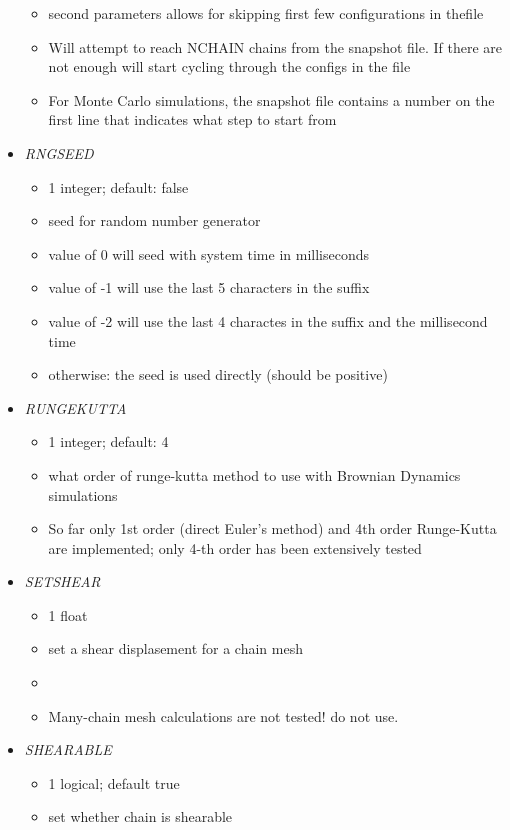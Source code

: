 \documentclass[12pt]{article}
\begin{document}
\begin{itemize}
\begin{itemize}
    \item second parameters allows for skipping first few configurations in thefile
    \item Will attempt to reach NCHAIN chains from the snapshot file. If there are not enough will start cycling through the configs in the file
    \item For Monte Carlo simulations, the snapshot file contains a number on the first line that indicates what step to start from
  \end{itemize}
%
\item {\it RNGSEED}
  \begin{itemize}
    \item 1 integer; default: false
    \item seed for random number generator
    \item value of 0 will seed with system time in milliseconds
    \item value of -1 will use the last 5 characters in the suffix
    \item value of -2 will use the last 4 charactes in the suffix and the millisecond time
    \item otherwise: the seed is used directly (should be positive)
  \end{itemize}
%
\item {\it RUNGEKUTTA}
  \begin{itemize}
    \item 1 integer; default: 4
    \item what order of runge-kutta method to use with Brownian Dynamics simulations
    \item So far only 1st order (direct Euler's method) and 4th order Runge-Kutta are implemented; only 4-th order has been extensively tested
  \end{itemize}
%
\item {\it SETSHEAR}
  \begin{itemize}
    \item 1 float
    \item set a shear displasement for a chain mesh
    \item  \item {\color{red} Many-chain mesh calculations are not tested! do not use.}
   \end{itemize}
%
\item {\it SHEARABLE}
  \begin{itemize}
    \item 1 logical; default true
    \item set whether chain is shearable

\end{itemize}
\end{itemize}
\end{document}
